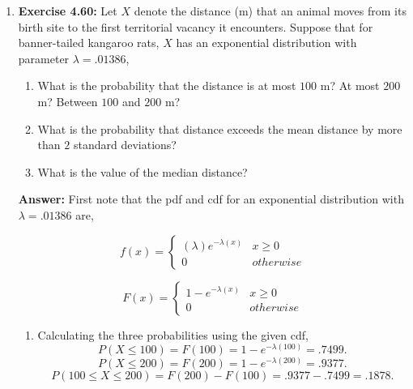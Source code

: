 \documentclass[12pt]{article}
\theoremstyle{homework}
\begin{document}
\begin{enumerate}
\item\hspace{.5in}\textbf{Exercise 4.60:} Let $X$ denote the distance (m) that an animal moves from its birth site to the first territorial vacancy it encounters. Suppose that for banner-tailed kangaroo rats, $X$ has an exponential distribution with parameter $\lambda = .01386$,
\begin{enumerate}
\item What is the probability that the distance is at most $100$ m? At most $200$ m? Between $100$ and $200$ m?
\item What is the probability that distance exceeds the mean distance by more than $2$ standard deviations?
\item What is the value of the median distance?
\end{enumerate}
\textbf{Answer:} First note that the pdf and cdf for an exponential distribution with $\lambda =  .01386$ are,

\[ f(x) =  \begin{cases} 
    (\lambda)e^{-\lambda(x)} & x \geq 0 \\
    0 & otherwise 
 \end{cases}
\]

\[ F(x) =\begin{cases} 
    1-e^{-\lambda(x)} & x \geq 0 \\
    0 & otherwise 
 \end{cases}
\]

\begin{enumerate}
\item Calculating the three probabilities using the given cdf,
\begin{equation*}
  P(X \le 100) = F(100) =  1-e^{-\lambda(100)} = .7499.
\end{equation*}
\begin{equation*}
  P(X \le 200) = F(200) =  1-e^{-\lambda(200)} = .9377.
\end{equation*}
\begin{equation*}
  P(100 \le X \le 200) = F(200) - F(100) = .9377 - .7499 = .1878.
\end{equation*}


\end{enumerate}
\end{enumerate}
\end{document}
